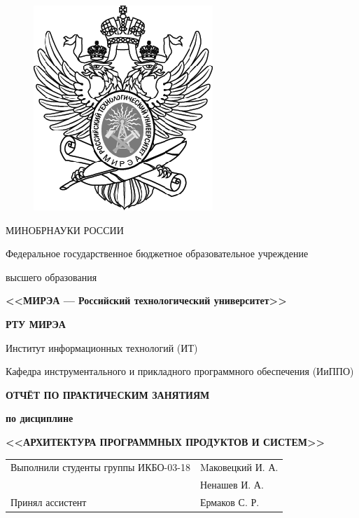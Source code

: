 \begin{titlepage}
\newpage

\begin{figure}
	\centering
	\includegraphics{images/insigne.eps}
\end{figure}

\begin{center}
	\small{МИНОБРНАУКИ РОССИИ}

	\small{Федеральное государственное бюджетное образовательное учреждение} 
	

	\small{высшего образования}

	\textbf{<<МИРЭА --- Российский технологический университет>>}

	\large{\textbf{РТУ МИРЭА}}
\end{center}

\hrulefill


\begin{center}
	\small{Институт информационных технологий (ИТ)}

	\small{Кафедра инструментального и прикладного программного обеспечения (ИиППО)}
\end{center}

\vspace{0,9 cm}
	
\begin{center}
	\small{\textbf{ОТЧЁТ ПО ПРАКТИЧЕСКИМ ЗАНЯТИЯМ}}
	
	\small{\textbf{по дисциплине}}

	\normalsize{\textbf{<<АРХИТЕКТУРА ПРОГРАММНЫХ ПРОДУКТОВ И СИСТЕМ>>}}
\end{center}

\vspace{0,9 cm}

\begin{tabular} {p{290pt} l }
	\small{Выполнили студенты группы ИКБО-03-18} & \small{Mаковецкий И. А.} \\
	\small{} & \small{Ненашев И. А.} \\ [0,9 cm]
	\small{Принял ассистент} & \small{Ермаков С. Р.} 
\end{tabular}


\end{titlepage}

